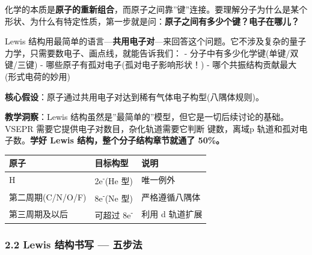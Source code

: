 化学的本质是\textbf{原子的重新组合}，而原子之间靠''键''连接。要理解分子为什么是某个形状、为什么有特定性质，第一步就是问：\textbf{原子之间有多少个键？电子在哪儿？}

Lewis 结构用最简单的语言---\textbf{共用电子对}---来回答这个问题。它不涉及复杂的量子力学，只需要数电子、画点线，就能告诉我们：
- 分子中有多少化学键(单键/双键/三键)
- 哪些原子有孤对电子(孤对电子影响形状！)
- 哪个共振结构贡献最大(形式电荷的妙用)

\textbf{核心假设}：原子通过共用电子对达到稀有气体电子构型(八隅体规则)。

\textbf{教学洞察}：Lewis 结构虽然是''最简单的''模型，但它是一切后续讨论的基础。VSEPR 需要它提供电子对数目，杂化轨道需要它判断  键数，离域 p 轨道和孤对电子数。\textbf{学好 Lewis 结构，整个分子结构章节就通了 50\%。}

{\def\LTcaptype{none} %
\begin{longtable}[]{@{}lll@{}}
\toprule\noalign{}
原子 & 目标构型 & 说明 \\
\midrule\noalign{}
\endhead
\bottomrule\noalign{}
\endlastfoot
H & 2e\textsuperscript{-}(He 型) & 唯一例外 \\
第二周期(C/N/O/F) & 8e\textsuperscript{-}(Ne 型) & 严格遵循八隅体 \\
第三周期及以后 & 可超过 8e\textsuperscript{-} & 利用 d 轨道扩展 \\
\end{longtable}
}

\subsubsection{2.2 Lewis 结构书写 --- 五步法}\label{lewis-ux7ed3ux6784ux4e66ux5199-ux4e94ux6b65ux6cd5}

\begin{Shaded}
\begin{Highlighting}[]




\end{Highlighting}
\end{Shaded}

